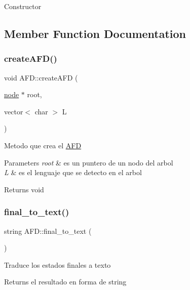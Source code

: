 Constructor 

\subsection{Member Function Documentation}
\hypertarget{class_a_f_d_a9b17ebe33cebd28351196a217b023a0e}{}\label{class_a_f_d_a9b17ebe33cebd28351196a217b023a0e} 
\subsubsection{\texorpdfstring{create\+A\+F\+D()}{createAFD()}}
{\footnotesize\ttfamily void A\+F\+D\+::create\+A\+FD (\begin{DoxyParamCaption}\item[{\hyperlink{structnode}{node} $\ast$}]{root,  }\item[{vector$<$ char $>$}]{L }\end{DoxyParamCaption})}

Metodo que crea el \hyperlink{class_a_f_d}{A\+FD} 
\begin{DoxyParams}{Parameters}
{\em root} & es un puntero de un nodo del arbol \\
\hline
{\em L} & es el lenguaje que se detecto en el arbol \\
\hline
\end{DoxyParams}
\begin{DoxyReturn}{Returns}
void 
\end{DoxyReturn}
\hypertarget{class_a_f_d_a6882d0942eceb2af40e8a1fe7c057d6e}{}\label{class_a_f_d_a6882d0942eceb2af40e8a1fe7c057d6e} 
\subsubsection{\texorpdfstring{final\+\_\+to\+\_\+text()}{final\_to\_text()}}
{\footnotesize\ttfamily string A\+F\+D\+::final\+\_\+to\+\_\+text (\begin{DoxyParamCaption}{ }\end{DoxyParamCaption})}

Traduce los estados finales a texto \begin{DoxyReturn}{Returns}
el resultado en forma de string 
\end{DoxyReturn}
\hypertarget{class_a_f_d_ae5af7aa0559c41a4857d1b81f66ac3a9}{}\label{class_a_f_d_ae5af7aa0559c41a4857d1b81f66ac3a9} 
